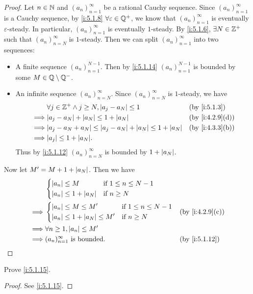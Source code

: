 \begin{proof}
  Let \(n \in \mathbb{N}\) and \((a_n)_{n = 1}^{\infty}\) be a rational Cauchy sequence.
  Since \((a_n)_{n = 1}^{\infty}\) is a Cauchy sequence, by \cref{i:5.1.8} \(\forall \varepsilon \in \mathbb{Q}^+\), we know that \((a_n)_{n = 1}^{\infty}\) is eventually \(\varepsilon\)-steady.
  In particular, \((a_n)_{n = 1}^{\infty}\) is eventually \(1\)-steady.
  By \cref{i:5.1.6}, \(\exists N \in \mathbb{Z}^+\) such that \((a_n)_{n = N}^{\infty}\) is \(1\)-steady.
  Then we can split \((a_n)_{n = 1}^{\infty}\) into two sequences:
  \begin{itemize}
    \item A finite sequence \((a_n)_{n = 1}^{N - 1}\).
          Then by \cref{i:5.1.14} \((a_n)_{n = 1}^{N - 1}\) is bounded by some \(M \in \mathbb{Q} \setminus \mathbb{Q}^-\).
    \item An infinite sequence \((a_n)_{n = N}^{\infty}\).
          Since \((a_n)_{n = N}^\infty\) is \(1\)-steady, we have
          \begin{align*}
                     & \forall j \in \Z^+ \land j \geq N, \abs{a_j - a_N} \leq 1                 &  & \by{i:5.1.3}    \\
            \implies & \abs{a_j - a_N} + \abs{a_N} \leq 1 + \abs{a_N}                            &  & \by{i:4.2.9}[d] \\
            \implies & \abs{a_j - a_N + a_N} \leq \abs{a_j - a_N} + \abs{a_N} \leq 1 + \abs{a_N} &  & \by{i:4.3.3}[b] \\
            \implies & \abs{a_j} \leq 1 + \abs{a_N}.
          \end{align*}
          Thus by \cref{i:5.1.12} \((a_n)_{n = N}^\infty\) is bounded by \(1 + \left\lvert a_N\right\rvert\).
  \end{itemize}
  Now let \(M' = M + 1 + \left\lvert a_N\right\rvert\).
  Then we have
  \begin{align*}
             & \begin{dcases}
                 \abs{a_n} \leq M             & \text{if } 1 \leq n \leq N - 1 \\
                 \abs{a_n} \leq 1 + \abs{a_N} & \text{if } n \geq N
               \end{dcases}                               \\
    \implies & \begin{dcases}
                 \abs{a_n} \leq M \leq M'             & \text{if } 1 \leq n \leq N - 1 \\
                 \abs{a_n} \leq 1 + \abs{a_N} \leq M' & \text{if } n \geq N
               \end{dcases} &  & \by{i:4.2.9}[c]                       \\
    \implies & \forall n \geq 1, \abs{a_n} \leq M'                                                         \\
    \implies & (a_n)_{n = 1}^\infty \text{ is bounded}.                                 &  & \by{i:5.1.12}
  \end{align*}
\end{proof}

\exercisesection

\begin{ex}\label{i:ex:5.1.1}
  Prove \cref{i:5.1.15}.
\end{ex}

\begin{proof}
  See \cref{i:5.1.15}.
\end{proof}
